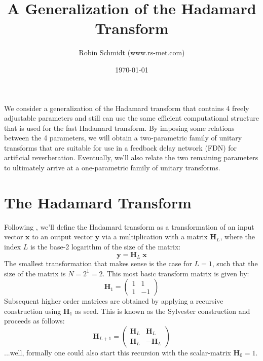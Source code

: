 \title{A Generalization of the Hadamard Transform}
\author{Robin Schmidt (www.rs-met.com)}
\date{\today}
\maketitle

We consider a generalization of the Hadamard transform that contains 4 freely adjustable parameters and still can use the same efficient computational structure that is used for the fast Hadamard transform. By imposing some relations between the 4 parameters, we will obtain a two-parametric family of unitary transforms that are suitable for use in a feedback delay network (FDN) for artificial reverberation. Eventually, we'll also relate the two remaining parameters to ultimately arrive at a one-parametric family of unitary transforms.

\section{The Hadamard Transform}
Following \cite{Gum}, we'll define the Hadamard transform as a transformation of an input vector $\mathbf{x}$ to an output vector $\mathbf{y}$ via a multiplication with a matrix $\mathbf{H}_L$, where the index $L$ is the base-2 logarithm of the size of the matrix:
\begin{equation}
 \mathbf{y} = \mathbf{H}_L \; \mathbf{x}
\end{equation}
The smallest transformation that makes sense is the case for $L=1$, such that the size of the matrix is $N = 2^1 = 2$. This most basic transform matrix is given by:
\begin{equation}
 \mathbf{H}_1 =
 \begin{pmatrix}
 1 &  1  \\
 1 & -1
 \end{pmatrix}
\end{equation}
Subsequent higher order matrices are obtained by applying a recursive construction using $\mathbf{H}_1$ as seed. This is known as the Sylvester construction and proceeds as follows:
\begin{equation}
 \mathbf{H}_{L+1} =
 \begin{pmatrix}
 \mathbf{H}_L &  \mathbf{H}_L  \\
 \mathbf{H}_L & -\mathbf{H}_L
 \end{pmatrix}
\end{equation}
...well, formally one could also start this recursion with the scalar-matrix $\mathbf{H}_0 = 1$.

